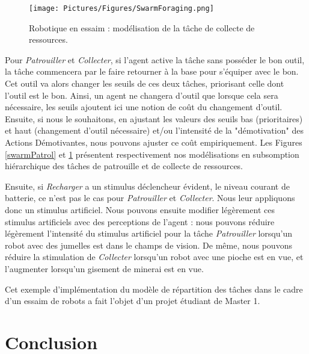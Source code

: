 	\begin{figure}	
	\centering
	\texttt{[image: Pictures/Figures/SwarmForaging.png]}
	\caption{Robotique en essaim : modélisation de la tâche de collecte de ressources.}
	\label{swarmForaging}
	\end{figure}
		
		Pour \textit{Patrouiller} et \textit{Collecter}, si l'agent active la tâche sans posséder le bon outil, la tâche commencera par le faire retourner à la base pour s'équiper avec le bon. Cet outil va alors changer les seuils de ces deux tâches, priorisant celle dont l'outil est le bon. Ainsi, un agent ne changera d'outil que lorsque cela sera nécessaire, les seuils ajoutent ici une notion de coût du changement d'outil. Ensuite, si nous le souhaitons, en ajustant les valeurs des seuils bas (prioritaires) et haut (changement d'outil nécessaire) et/ou l'intensité de la "démotivation" des Actions Démotivantes, nous pouvons ajuster ce coût empiriquement. Les Figures \ref{swarmPatrol} et \ref{swarmForaging} présentent respectivement nos modélisations en subsomption hiérarchique des tâches de patrouille et de collecte de ressources. 
		
		Ensuite, si \textit{Recharger} a un stimulus déclencheur évident, le niveau courant de batterie, ce n'est pas le cas pour \textit{Patrouiller} et \textit{Collecter}. Nous leur appliquons donc un stimulus artificiel. Nous pouvons ensuite modifier légèrement ces stimulus artificiels avec des perceptions de l'agent : nous pouvons réduire légèrement l'intensité du stimulus artificiel pour la tâche \textit{Patrouiller} lorsqu'un robot avec des jumelles est dans le champs de vision. De même, nous pouvons réduire la stimulation de \textit{Collecter} lorsqu'un robot avec une pioche est en vue, et l'augmenter lorsqu'un gisement de minerai est en vue.
		
		Cet exemple d'implémentation du modèle de répartition des tâches dans le cadre d'un essaim de robots a fait l'objet d'un projet étudiant de Master 1.
			
			
				
	\section*{Conclusion}
